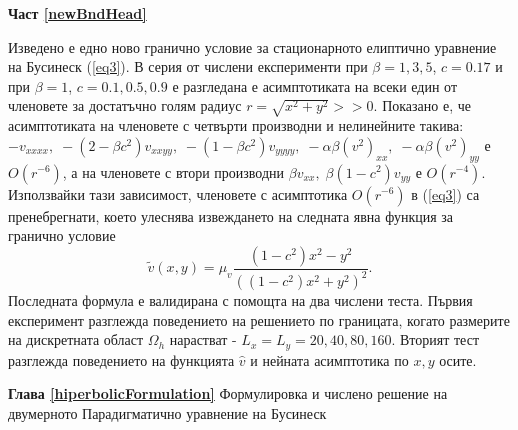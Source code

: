 \documentclass[a4paper]{article}
\newcommand{\be}{\begin{equation}}
\newcommand{\ee}{\end{equation}}
\newcommand{\rf}[1]{(\ref{#1})}
\theoremstyle{remark}
\begin{document}
\textbf{Част \ref{newBndHead}}

Изведено е едно ново гранично условие за стационарното елиптично уравнение на Бусинеск \rf{eq3}. В серия от числени експерименти при $\beta=1,3,5$, $c=0.17$ и при $\beta=1$, $c=0.1, 0.5, 0.9$ е разгледана е асимптотиката  на всеки един от членовете за достатъчно голям радиус $r=\sqrt{x^2 + y^2} >> 0$. Показано е, че асимптотиката на членовете с четвърти производни и нелинейните такива: $- v_{xxxx}, \;  - (2-\beta c^2)v_{xxyy},  \;  - (1-\beta c^2)v_{yyyy}, \;  - \alpha \beta (v^2)_{xx}, \; - \alpha \beta (v^2)_{yy}$ е $O(r^{-6})$, а на членовете с втори производни $\beta v_{xx}, \; \beta (1-c^2) v_{yy}$ е $O(r^{-4})$. Използвайки тази зависимост, членовете с асимптотика $O(r^{-6})$ в \rf{eq3} са пренебрегнати, което улеснява извеждането на следната явна функция за гранично условие
\be
\tilde v(x, y) = \mu_v \frac{ (1-c^2) x^2 - y^2 }{ ((1-c^2) x^2 + y^2)^2 }.
\ee
Последната формула е валидирана с помощта на два числени теста. Първия експеримент разглежда поведението на решението по границата, когато размерите на дискретната област $\Omega_h$ нарастват - $L_x = L_y = 20, 40, 80, 160$. Вторият тест разглежда поведението на функцията $\widehat v$ и нейната асимптотика по $x,y$ осите.


\textbf{Глава \ref{hiperbolicFormulation}} Формулировка и числено решение на двумерното Парадигматично уравнение на Бусинеск
\end{document}
